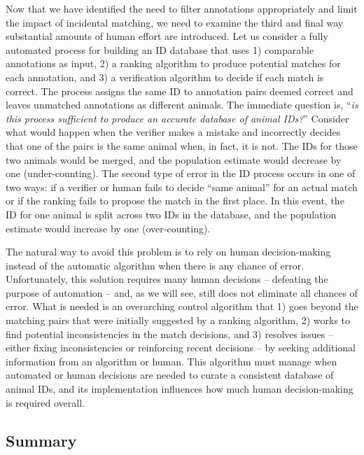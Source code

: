 Now that we have identified the need to filter annotations appropriately and limit the impact of incidental matching, we need to examine the third and final way substantial amounts of human effort are introduced.  Let us consider a fully automated process for building an ID database that uses 1) comparable annotations as input, 2) a ranking algorithm to produce potential matches for each annotation, and 3) a verification algorithm to decide if each match is correct.  The process assigns the same ID to annotation pairs deemed correct and leaves unmatched annotations as different animals.  The immediate question is, ``\textit{is this process sufficient to produce an accurate database of animal IDs?}''  Consider what would happen when the verifier makes a mistake and incorrectly decides that one of the pairs is the same animal when, in fact, it is not.  The IDs for those two animals would be merged, and the population estimate would decrease by one (under-counting).  The second type of error in the ID process occurs in one of two ways: if a verifier or human fails to decide ``same animal'' for an actual match or if the ranking fails to propose the match in the first place.  In this event, the ID for one animal is split across two IDs in the database, and the population estimate would increase by one (over-counting).

The natural way to avoid this problem is to rely on human decision-making instead of the automatic algorithm when there is any chance of error.  Unfortunately, this solution requires many human decisions -- defeating the purpose of automation -- and, as we will see, still does not eliminate all chances of error.  What is needed is an overarching control algorithm that 1) goes beyond the matching pairs that were initially suggested by a ranking algorithm, 2) works to find potential inconsistencies in the match decisions, and 3) resolves issues -- either fixing inconsistencies or reinforcing recent decisions -- by seeking additional information from an algorithm or human.  This algorithm must manage when automated or human decisions are needed to curate a consistent database of animal IDs, and its implementation influences how much human decision-making is required overall.

\subsection{Summary}

